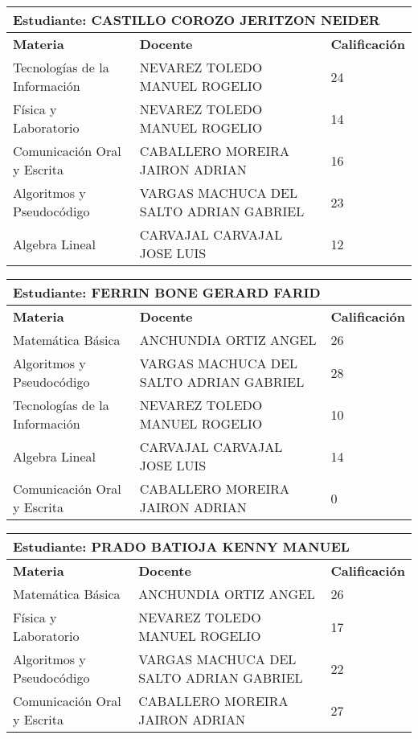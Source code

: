 \begin{tabularx}{\textwidth}{|p{5cm}|p{7cm}|X|}
\hline
\multicolumn{3}{|p{\dimexpr\textwidth-2\tabcolsep-2\arrayrulewidth}|}{\textbf{Estudiante: CASTILLO COROZO JERITZON NEIDER }}\\\hline
\textbf{Materia} & \textbf{Docente} & \textbf{Calificación} \\ \hline
Tecnologías de la Información  & NEVAREZ TOLEDO MANUEL ROGELIO  & 24 \\ \hline
Física y Laboratorio & NEVAREZ TOLEDO MANUEL ROGELIO  & 14 \\ \hline
Comunicación Oral y Escrita & CABALLERO MOREIRA JAIRON ADRIAN  & 16 \\ \hline
Algoritmos y Pseudocódigo & VARGAS MACHUCA DEL SALTO ADRIAN GABRIEL  & 23 \\ \hline
Algebra Lineal & CARVAJAL CARVAJAL JOSE LUIS  & 12 \\ \hline
\end{tabularx}\vspace{10mm}
\small
\begin{tabularx}{\textwidth}{|p{5cm}|p{7cm}|X|}
\hline
\multicolumn{3}{|p{\dimexpr\textwidth-2\tabcolsep-2\arrayrulewidth}|}{\textbf{Estudiante: FERRIN BONE GERARD FARID }}\\\hline
\textbf{Materia} & \textbf{Docente} & \textbf{Calificación} \\ \hline
Matemática Básica & ANCHUNDIA ORTIZ ANGEL   & 26 \\ \hline
Algoritmos y Pseudocódigo & VARGAS MACHUCA DEL SALTO ADRIAN GABRIEL  & 28 \\ \hline
Tecnologías de la Información  & NEVAREZ TOLEDO MANUEL ROGELIO  & 10 \\ \hline
Algebra Lineal & CARVAJAL CARVAJAL JOSE LUIS  & 14 \\ \hline
Comunicación Oral y Escrita & CABALLERO MOREIRA JAIRON ADRIAN  & 0 \\ \hline
\end{tabularx}\vspace{10mm}
\small
\begin{tabularx}{\textwidth}{|p{5cm}|p{7cm}|X|}
\hline
\multicolumn{3}{|p{\dimexpr\textwidth-2\tabcolsep-2\arrayrulewidth}|}{\textbf{Estudiante: PRADO BATIOJA KENNY MANUEL }}\\\hline
\textbf{Materia} & \textbf{Docente} & \textbf{Calificación} \\ \hline
Matemática Básica & ANCHUNDIA ORTIZ ANGEL   & 26 \\ \hline
Física y Laboratorio & NEVAREZ TOLEDO MANUEL ROGELIO  & 17 \\ \hline
Algoritmos y Pseudocódigo & VARGAS MACHUCA DEL SALTO ADRIAN GABRIEL  & 22 \\ \hline
Comunicación Oral y Escrita & CABALLERO MOREIRA JAIRON ADRIAN  & 27 \\ \hline
\end{tabularx}\vspace{10mm}
